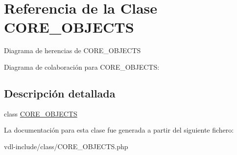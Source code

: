 \hypertarget{class_c_o_r_e___o_b_j_e_c_t_s}{\section{Referencia de la Clase C\-O\-R\-E\-\_\-\-O\-B\-J\-E\-C\-T\-S}
\label{class_c_o_r_e___o_b_j_e_c_t_s}
}


Diagrama de herencias de C\-O\-R\-E\-\_\-\-O\-B\-J\-E\-C\-T\-S


Diagrama de colaboración para C\-O\-R\-E\-\_\-\-O\-B\-J\-E\-C\-T\-S\-:


\subsection{Descripción detallada}
class \hyperlink{class_c_o_r_e___o_b_j_e_c_t_s}{C\-O\-R\-E\-\_\-\-O\-B\-J\-E\-C\-T\-S} 

La documentación para esta clase fue generada a partir del siguiente fichero\-:\begin{DoxyCompactItemize}
\item 
vdl-\/include/class/C\-O\-R\-E\-\_\-\-O\-B\-J\-E\-C\-T\-S.\-php\end{DoxyCompactItemize}
